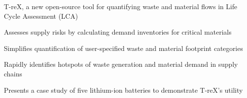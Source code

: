 \documentclass[review,3p,authoryear]{elsarticle}
\begin{document}
\begin{highlights}
    \item T-reX, a new open-source tool for quantifying waste and material flows in Life Cycle Assessment (LCA)
    \item Assesses supply risks by calculating demand inventories for critical materials
    \item Simplifies quantification of user-specified waste and material footprint categories
    \item Rapidly identifies hotspots of waste generation and material demand in supply chains
    \item Presents a case study of five lithium-ion batteries to demonstrate T-reX's utility
\end{highlights}
\end{document}
